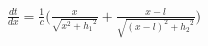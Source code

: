 \documentclass[preview]{standalone}
\begin{document}
\begin{align*}
{\frac{dt}{dx} = \frac{1}{c} (\frac{x}{\sqrt{x^2 + {h_1}^2}} + \frac{x-l}{\sqrt{(x-l)^2 + {h_2}^2}}})
\end{align*}
\end{document}
